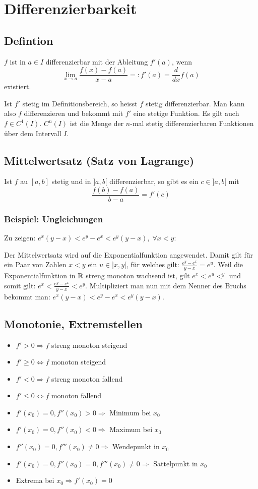 \section{Differenzierbarkeit}
\subsection{Defintion}
$f$ ist in $a \in I$ differenzierbar mit der Ableitung $f'(a)$, wenn
\[
\lim_{x \to a} \frac{f(x) - f(a)}{x - a} =: f'(a) = \frac{d}{dx}f(a)
\]
existiert.

Ist $f'$ stetig im Definitionsbereich, so heisst $f$ stetig differenzierbar. Man
kann also $f$ differenzieren und bekommt mit $f'$ eine stetige Funktion. Es gilt
auch $f \in C^1(I)$. $C^n(I)$ ist die Menge der $n$-mal stetig differenzierbaren
Funktionen über dem Intervall $I$.

\subsection{Mittelwertsatz (Satz von Lagrange)}
Ist $f$ au $[a,b]$ stetig und in $]a, b[$ differenzierbar, so gibt es ein $c
\in ]a,b[$ mit
\[
\frac{f(b) - f(a)}{b-a} = f'(c)
\]

\subsubsection{Beispiel: Ungleichungen}
Zu zeigen: $e^x(y-x) < e^y - e^x < e^y(y-x), \; \forall x < y$:


Der Mittelwertsatz wird auf die Exponentialfunktion angewendet. Damit gilt für
ein Paar von Zahlen $x < y$ ein $u \in ]x,y[$, für welches gilt: $\frac{e^y
- e^x}{y-x} = e^u$. Weil die Exponentialfunktion in $\mathbb{R}$ streng monoton wachsend
ist, gilt $e^x < e^u <^y$ und somit gilt: $e^x < \frac{e^y-e^x}{y-x} < e^y$.
Multipliziert man nun mit dem Nenner des Bruchs bekommt man: $e^x (y-x) < e^y -
e^x < e^y(y-x)$.



\subsection{Monotonie, Extremstellen}
\begin{itemize}
  \item $f' > 0 \Rightarrow f$ streng monoton steigend
  \item $f' \geq 0 \Leftrightarrow f$ monoton steigend
  \item $f' < 0 \Rightarrow f$ streng monoton fallend
  \item $f' \leq 0 \Leftrightarrow f$ monoton fallend
  \item $f'(x_0) = 0, f''(x_0) > 0 \Rightarrow$ Minimum bei $x_0$
  \item $f'(x_0) = 0, f''(x_0) < 0 \Rightarrow$ Maximum bei $x_0$
  \item $f''(x_0) = 0, f'''(x_0) \neq 0 \Rightarrow$ Wendepunkt in $x_0$
  \item $f'(x_0) = 0, f''(x_0) = 0, f'''(x_0) \neq 0 \Rightarrow$ Sattelpunkt in
  $x_0$
  \item Extrema bei $x_0 \Rightarrow f'(x_0) = 0$
\end{itemize}